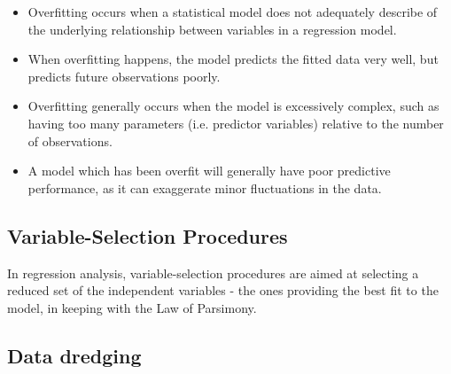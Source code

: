 \documentclass[a4paper,12pt]{article}
\begin{document}
	



\begin{itemize}
	\item Overfitting occurs when a statistical model does not adequately describe of the underlying relationship between variables in a regression model. 
	\item When overfitting happens, the model predicts the fitted data very well, but predicts future observations poorly.
	
	\item Overfitting generally occurs when the model is excessively complex, such as having too many parameters (i.e. predictor variables) relative to the number of observations.
	\item A model which has been overfit will generally have poor predictive performance, as it can exaggerate minor fluctuations in the data.
\end{itemize}



\subsection{Variable-Selection Procedures}

In regression analysis, variable-selection procedures are aimed at selecting a reduced set of the independent variables - the ones providing the best fit to the model, in keeping with the Law of Parsimony.


\subsection{Data dredging}
\end{document}
